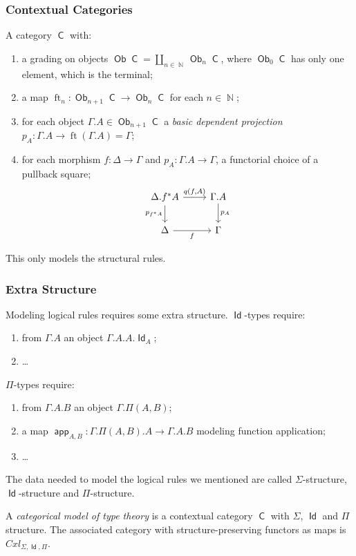 \documentclass{beamer}
\DeclareMathOperator{\Id}{\mathsf{Id}}
\DeclareMathOperator{\sfC}{\mathsf{C}}
\DeclareMathOperator{\N}{\mathbb{N}}
\DeclareMathOperator{\Ob}{\mathsf{Ob}}
\DeclareMathOperator{\ft}{ft}
\DeclareMathOperator{\app}{\mathsf{app}}
\begin{document}
\begin{frame}
  \frametitle{Contextual Categories}

  \begin{definition}
    A category $\sfC$ with:
    \begin{enumerate}
      \item a grading on objects $\Ob\sfC=\coprod_{n\in\N}\Ob_n\sfC$, where
        $\Ob_0\sfC$ has only one element, which is the terminal;
      \item a map $\ft_n\colon\Ob_{n+1}\sfC\rightarrow\Ob_n\sfC$ for each
        $n\in\N$;
      \item for each object $\Gamma.A\in\Ob_{n+1}\sfC$ a \emph{basic dependent
        projection} $p_A\colon\Gamma.A\rightarrow\ft(\Gamma.A)=\Gamma$;
      \item for each morphism $f\colon\Delta\rightarrow\Gamma$ and
        $p_A\colon\Gamma.A\rightarrow\Gamma$, a functorial choice of a pullback
        square;
        \[\begin{tikzcd}[ampersand replacement=\&]
          {\Delta.f^*A} \& {\Gamma.A} \\
          \Delta \& \Gamma
          \arrow["{p_A}", from=1-2, to=2-2]
          \arrow["{p_{f^*A}}"', from=1-1, to=2-1]
          \arrow["{q(f,A)}", from=1-1, to=1-2]
          \arrow["f"', from=2-1, to=2-2]
        \end{tikzcd}\]
    \end{enumerate}
  \end{definition}
  
  This only models the structural rules.
\end{frame}

\begin{frame}
  \frametitle{Extra Structure}
  Modeling logical rules requires some extra structure. $\Id$-types require:
  \begin{enumerate}
    \item from $\Gamma.A$ an object $\Gamma.A.A.\Id_A$;
    \item \ldots
  \end{enumerate}
  $\Pi$-types require:
  \begin{enumerate}
    \item from $\Gamma.A.B$ an object $\Gamma.\Pi(A,B)$;
    \item a map $\app_{A,B}\colon\Gamma.\Pi(A,B).A\rightarrow\Gamma.A.B$
      modeling function application;
    \item \ldots
  \end{enumerate}
  The data needed to model the logical rules we mentioned are
  called $\Sigma$-structure, $\Id$-structure and $\Pi$-structure.

  \begin{defn}
    A \emph{categorical model of type theory} is a contextual category $\sfC$
    with $\Sigma$, $\Id$ and $\Pi$ structure. The associated category with
    structure-preserving functors as maps is $Cxl_{\Sigma,\Id,\Pi}$.
  \end{defn}
\end{frame}
\end{document}
